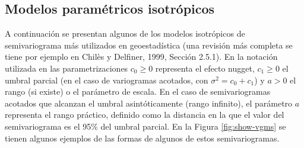 \documentclass[
  spanish,
]{book}
\theoremstyle{break}
\theoremstyle{definition}
\theoremstyle{definition}
\theoremstyle{definition}
\theoremstyle{definition}
\theoremstyle{remark}
\begin{document}
\hypertarget{modelos-parametricos}{%
\subsection{Modelos paramétricos isotrópicos}\label{modelos-parametricos}}

A continuación se presentan algunos de los modelos isotrópicos de semivariograma más utilizados en geoestadística (una revisión más completa se tiene por ejemplo en Chilès y Delfiner, 1999, Sección 2.5.1).
En la notación utilizada en las parametrizaciones \(c_{0} \geq 0\) representa el efecto nugget, \(c_1 \geq 0\) el umbral parcial (en el caso de variogramas acotados, con \(\sigma^2= c_0 + c_1\)) y \(a>0\) el rango (si existe) o el parámetro de escala.
En el caso de semivariogramas acotados que alcanzan el umbral asintóticamente (rango infinito), el parámetro \(a\) representa el rango práctico, definido como la distancia en la que el valor del semivariograma es el 95\% del umbral parcial.
En la Figura \ref{fig:show-vgms} se tienen algunos ejemplos de las formas de algunos de
estos semivariogramas.
\end{document}
